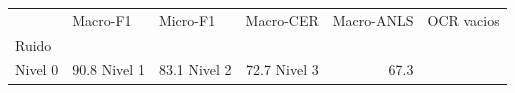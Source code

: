 \begin{tabular}{lllrrr}
\toprule
 & Macro-F1 & Micro-F1 & Macro-CER & Macro-ANLS & OCR vacios \\
Ruido &  &  &  &  &  \\
\midrule
Nivel 0 & 90.8%
Nivel 1 & 83.1%
Nivel 2 & 72.7%
Nivel 3 & 67.3%
\bottomrule
\end{tabular}
